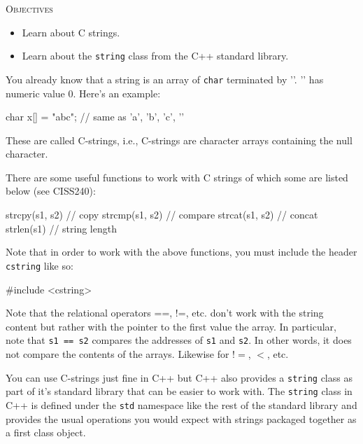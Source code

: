 \newpage{}

\textsc{Objectives}

\begin{itemize}
\item
  Learn about C strings.
\item
  Learn about the \texttt{string} class from the C++ standard library.
\end{itemize}

\newpage{}

You already know that a string is an array of \texttt{char} terminated by '\0'. '\0' has numeric value 0. Here's an example:

\begin{console}
char x[] = "abc"; // same as {'a', 'b', 'c', '\0'}
\end{console}

These are called C-strings, i.e., C-strings are character arrays
containing the null character.

There are some useful functions to work with C strings of which some are
listed below (see CISS240):

\begin{console}
strcpy(s1, s2) // copy
strcmp(s1, s2) // compare
strcat(s1, s2) // concat
strlen(s1) // string length
\end{console}

Note that in order to work with the above functions, you must include
the header \texttt{cstring} like so:

\begin{console}
#include <cstring>
\end{console}

Note that the relational operators ==, !=, etc. don't work with the string content but rather with the pointer to the first value the array. In particular, note that \texttt{s1 == s2} compares the addresses of \texttt{s1} and \texttt{s2}. In other words, it does not compare the contents of the arrays. Likewise for $!=$, $<$, etc.

\newpage{}

You can use C-strings just fine in C++ but C++ also provides a
\texttt{string} class as part of it's standard library
that can be easier to work with. The \texttt{string} class in C++ is
defined under the \texttt{std} namespace like the rest of the standard
library and provides the usual operations you would expect with strings
packaged together as a first class object.

